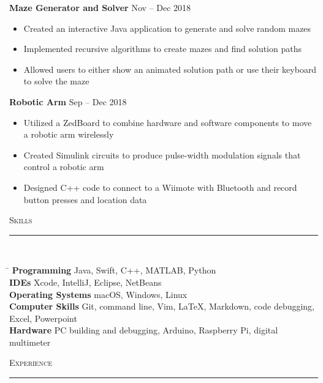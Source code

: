 \documentclass[11pt]{article}
\begin{document}
\begin{raggedright}
	\textbf{\large Maze Generator and Solver} 
	\hfill Nov -- Dec 2018
		\begin{itemize}
		\item Created an interactive Java application to generate and solve random mazes
		\item Implemented recursive algorithms to create mazes and find solution paths
		\item Allowed users to either show an animated solution path or use their keyboard to solve the maze
	\end{itemize}
	\vspace{0.1in}

	\textbf{\large Robotic Arm} 
	\hfill Sep -- Dec 2018
	\begin{itemize}
		\item Utilized a ZedBoard to combine hardware and software components to move a robotic arm wirelessly
		\item Created Simulink circuits to produce pulse-width modulation signals that control a robotic arm
		\item Designed C++ code to connect to a Wiimote with Bluetooth and record button presses and location data
	\end{itemize}
	\vspace{0.2in}
	
	\textsc{\Large Skills} \\
	\vspace{-0.1in}
	\rule{\textwidth}{0.4pt} \\
	\vspace{0.05in}

	\begin{tabbing}
		\hspace*{4cm}\= \kill
		\textbf{Programming}  \> Java, Swift, C++, MATLAB, Python \\
		\textbf{IDEs} \> Xcode, IntelliJ, Eclipse, NetBeans \\
		\textbf{Operating Systems} \> macOS, Windows, Linux \\
		\textbf{Computer Skills} \> Git, command line, Vim, LaTeX, Markdown, code debugging, Excel, Powerpoint \\
		\textbf{Hardware} \> PC building and debugging, Arduino, Raspberry Pi, digital multimeter
	\end{tabbing}
	\vspace{0.2in}

	\textsc{\Large Experience} \\
	\vspace{-0.1in}
	\rule{\textwidth}{0.4pt} \\
	\vspace{0.05in}


\end{raggedright}
\end{document}
